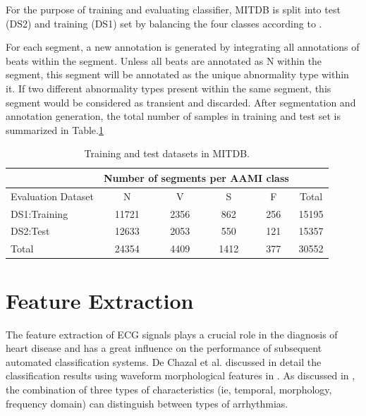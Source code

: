 
For the purpose of training and evaluating classifier, MITDB is split into test (DS2) and training (DS1) set by balancing the four classes according to \cite{autofs}. 

For each segment, a new annotation is generated by integrating all annotations of beats within the segment. Unless all beats are annotated as N within the segment, this segment will be annotated as the unique abnormality type within it. If two different abnormality types present within the same segment, this segment would be considered as transient and discarded. After segmentation and annotation generation, the total number of samples in training and test set is summarized in Table.\ref{table:ds}
\begin{table}[b]
	\centering
	\caption{Training and test datasets in MITDB.}
	\vspace{-0.05in}
	\begin{tabular}{|l||c|c|c|c|c|}
		\hline 
		& \multicolumn{4}{c}{Number of segments per AAMI class} &\\ 
		\hline 
		Evaluation Dataset& N & V & S & F &Total \\ 
		\hline 
		DS1:Training & 11721& 2356 & 862 & 256 & 15195\\ 
		\hline 
		DS2:Test & 12633 & 2053 & 550 & 121 & 15357 \\ 
		\hline 
		Total & 24354 & 4409 & 1412 & 377 & 30552 \\ 
		\hline 
	\end{tabular}
	\label{table:ds} 
	\vspace{-0.15in}
\end{table}

\section{Feature Extraction}

The feature extraction of ECG signals plays a crucial role in the diagnosis of heart disease and has a great influence on the performance of subsequent automated classification systems. De Chazal et al. discussed in detail the classification results using waveform morphological features in \cite{autofs}. As discussed in \cite{jambukia2015classification}, the combination of three types of characteristics (ie, temporal, morphology, frequency domain) can distinguish between types of arrhythmias. 

